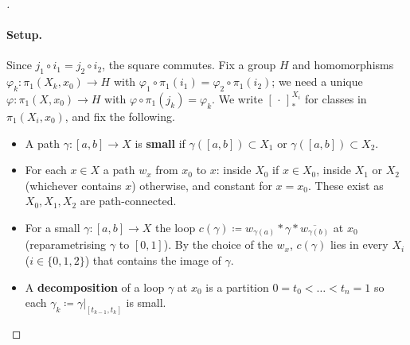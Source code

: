 \begin{proof}[]
  \paragraph{Setup.} Since $j_1\circ i_1=j_2\circ i_2$, the square commutes. Fix a group $H$ and homomorphisms $\varphi_k:\pi_1(X_k,x_0)\to H$ with $\varphi_1\circ\pi_1(i_1)=\varphi_2\circ\pi_1(i_2)$; we need a unique $\varphi:\pi_1(X,x_0)\to H$ with $\varphi\circ\pi_1(j_k)=\varphi_k$. We write $[\,\cdot\,]_*^{X_i}$ for classes in $\pi_1(X_i,x_0)$, and fix the following.
  \begin{itemize}
    \item A path $\gamma:[a,b]\to X$ is \textbf{small} if $\gamma([a,b])\subset X_1$ or $\gamma([a,b])\subset X_2$.
    \item For each $x\in X$ a path $w_x$ from $x_0$ to $x$: inside $X_0$ if $x\in X_0$, inside $X_1$ or $X_2$ (whichever contains $x$) otherwise, and constant for $x=x_0$. These exist as $X_0,X_1,X_2$ are path-connected.
    \item For a small $\gamma:[a,b]\to X$ the loop $c(\gamma)\coloneq w_{\gamma(a)}\ast\gamma\ast\overline{w_{\gamma(b)}}$ at $x_0$ (reparametrising $\gamma$ to $[0,1]$). By the choice of the $w_x$, $c(\gamma)$ lies in every $X_i$ ($i\in\{0,1,2\}$) that contains the image of $\gamma$.
    \item A \textbf{decomposition} of a loop $\gamma$ at $x_0$ is a partition $0=t_0<\dots<t_n=1$ so each $\gamma_k\coloneq\gamma|_{[t_{k-1},t_k]}$ is small.
  \end{itemize}
  \begin{figureBox}
\end{figureBox}
\end{proof}

